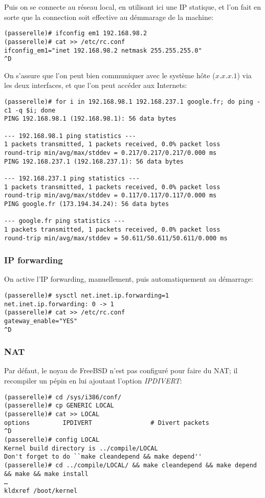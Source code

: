 Puis on se connecte au réseau local, en utilisant ici une IP
statique, et l'on fait en sorte que la connection soit effective
au démmarage de la machine:
\begin{verbatim}
(passerelle)# ifconfig em1 192.168.98.2
(passerelle)# cat >> /etc/rc.conf
ifconfig_em1="inet 192.168.98.2 netmask 255.255.255.0"
^D
\end{verbatim}

On s'assure que l'on peut bien communiquer avec le système hôte
($x.x.x.1$) via les deux interfaces, et que l'on peut accéder aux
Internets:
\begin{verbatim}
(passerelle)# for i in 192.168.98.1 192.168.237.1 google.fr; do ping -c1 -q $i; done
PING 192.168.98.1 (192.168.98.1): 56 data bytes

--- 192.168.98.1 ping statistics ---
1 packets transmitted, 1 packets received, 0.0% packet loss
round-trip min/avg/max/stddev = 0.217/0.217/0.217/0.000 ms
PING 192.168.237.1 (192.168.237.1): 56 data bytes

--- 192.168.237.1 ping statistics ---
1 packets transmitted, 1 packets received, 0.0% packet loss
round-trip min/avg/max/stddev = 0.117/0.117/0.117/0.000 ms
PING google.fr (173.194.34.24): 56 data bytes

--- google.fr ping statistics ---
1 packets transmitted, 1 packets received, 0.0% packet loss
round-trip min/avg/max/stddev = 50.611/50.611/50.611/0.000 ms
\end{verbatim}

\subsubsection{IP forwarding}
On active l'IP forwarding, manuellement, puis automatiquement
au démarrage:

\begin{verbatim}
(passerelle)# sysctl net.inet.ip.forwarding=1
net.inet.ip.forwarding: 0 -> 1
(passerelle)# cat >> /etc/rc.conf
gateway_enable="YES"
^D
\end{verbatim}

\subsubsection{NAT}
Par défaut, le noyau de FreeBSD n'est pas configuré pour faire
du NAT; il recompiler un pépin en lui ajoutant l'option \textit{IPDIVERT}:
\begin{verbatim}
(passerelle)# cd /sys/i386/conf/
(passerelle)# cp GENERIC LOCAL
(passerelle)# cat >> LOCAL
options         IPDIVERT                # Divert packets
^D
(passerelle)# config LOCAL
Kernel build directory is ../compile/LOCAL
Don't forget to do ``make cleandepend && make depend''
(passerelle)# cd ../compile/LOCAL/ && make cleandepend && make depend && make && make install
…
kldxref /boot/kernel
\end{verbatim}

